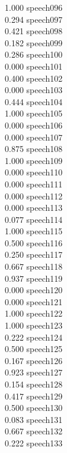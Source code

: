 \documentclass[10pt]{article}
\begin{document}
\begin{enumerate}
\begin{enumerate}
\begin{multicols}{5}
            1.000 speech096\\
            0.294 speech097\\
            0.421 speech098\\
            0.182 speech099\\
            0.286 speech100\\
            0.000 speech101\\
            0.400 speech102\\
            0.000 speech103\\
            0.444 speech104\\
            1.000 speech105\\
            0.000 speech106\\
            0.000 speech107\\
            0.875 speech108\\
            1.000 speech109\\
            0.000 speech110\\
            0.000 speech111\\
            0.000 speech112\\
            0.000 speech113\\
            0.077 speech114\\
            1.000 speech115\\
            0.500 speech116\\
            0.250 speech117\\
            0.667 speech118\\
            0.937 speech119\\
            0.000 speech120\\
            0.000 speech121\\
            1.000 speech122\\
            1.000 speech123\\
            0.222 speech124\\
            0.500 speech125\\
            0.167 speech126\\
            0.923 speech127\\
            0.154 speech128\\
            0.417 speech129\\
            0.500 speech130\\
            0.083 speech131\\
            0.667 speech132\\
            0.222 speech133\\

\end{multicols}
\end{enumerate}
\end{enumerate}
\end{document}
